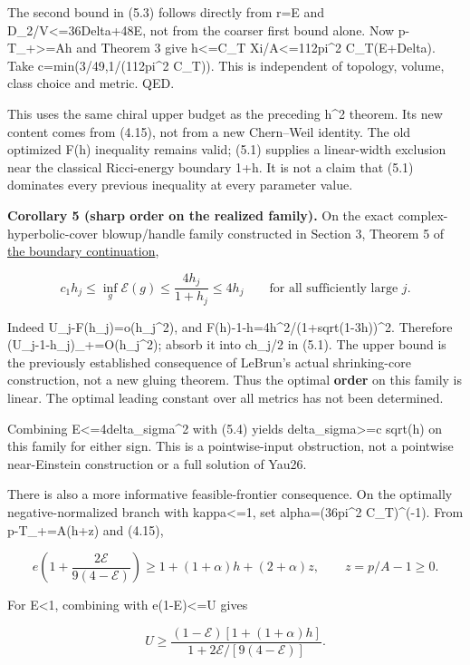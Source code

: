 \documentclass[
  10pt,
]{article}
\begin{document}
The second bound in (5.3) follows directly from r=E and
D\_2/V\textless=36Delta+48E, not from the coarser first bound alone. Now
p-T\_+\textgreater=Ah and Theorem 3 give h\textless=C\_T
Xi/A\textless=112pi\^{}2 C\_T(E+Delta). Take c=min(3/49,1/(112pi\^{}2
C\_T)). This is independent of topology, volume, class choice and
metric. QED.

This uses the same chiral upper budget as the preceding h\^{}2 theorem.
Its new content comes from (4.15), not from a new Chern--Weil identity.
The old optimized F(h) inequality remains valid; (5.1) supplies a
linear-width exclusion near the classical Ricci-energy boundary 1+h. It
is not a claim that (5.1) dominates every previous inequality at every
parameter value.

\textbf{Corollary 5 (sharp order on the realized family).} On the exact
complex-hyperbolic-cover blowup/handle family constructed in Section 3,
Theorem 5 of \href{20260926_boundary_compatibility.md}{the boundary
continuation},

\[
 \boxed{c_1h_j\le\inf_g\mathcal E(g)
                   \le\frac{4h_j}{1+h_j}\le4h_j}
                  \qquad\text{for all sufficiently large }j. \tag{5.4}
\]

Indeed U\_j-F(h\_j)=o(h\_j\^{}2), and
F(h)-1-h=4h\^{}2/(1+sqrt(1-3h))\^{}2. Therefore
(U\_j-1-h\_j)\_+=O(h\_j\^{}2); absorb it into ch\_j/2 in (5.1). The
upper bound is the previously established consequence of LeBrun's actual
shrinking-core construction, not a new gluing theorem. Thus the optimal
\textbf{order} on this family is linear. The optimal leading constant
over all metrics has not been determined.

Combining E\textless=4delta\_sigma\^{}2 with (5.4) yields
delta\_sigma\textgreater=c sqrt(h) on this family for either sign. This
is a pointwise-input obstruction, not a pointwise near-Einstein
construction or a full solution of Yau26.

There is also a more informative feasible-frontier consequence. On the
optimally negative-normalized branch with kappa\textless=1, set
alpha=(36pi\^{}2 C\_T)\^{}(-1). From p-T\_+=A(h+z) and (4.15),

\[
 e\left(1+\frac{2\mathcal E}{9(4-\mathcal E)}\right)
 \ge 1+(1+\alpha)h+(2+\alpha)z,\qquad z=p/A-1\ge0.
                                                               \tag{5.5}
\]

For E\textless1, combining with e(1-E)\textless=U gives

\[
 U\ge\frac{(1-\mathcal E)[1+(1+\alpha)h]}
                 {1+2\mathcal E/[9(4-\mathcal E)]}.  \tag{5.6}
\]
\end{document}
